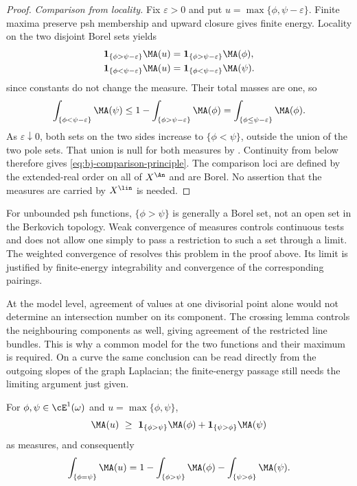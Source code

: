\begin{proof}
\emph{Comparison from locality.}
Fix $\varepsilon>0$ and put $u=\max\{\phi,\psi-\varepsilon\}$.
Finite maxima preserve psh membership and upward closure gives finite
energy. Locality on the two disjoint Borel sets yields
\[
 \begin{aligned}
 \mathbf1_{\{\phi>\psi-\varepsilon\}}\MA(u)
   &=\mathbf1_{\{\phi>\psi-\varepsilon\}}\MA(\phi),\\
 \mathbf1_{\{\phi<\psi-\varepsilon\}}\MA(u)
   &=\mathbf1_{\{\phi<\psi-\varepsilon\}}\MA(\psi).
 \end{aligned}
\]
since constants do not change the measure. Their total masses are one,
so
\[
 \int_{\{\phi<\psi-\varepsilon\}}\MA(\psi)
 \le 1-\int_{\{\phi>\psi-\varepsilon\}}\MA(\phi)
 =\int_{\{\phi\le\psi-\varepsilon\}}\MA(\phi).
\]
As $\varepsilon\downarrow0$, both sets on the two sides increase to
$\{\phi<\psi\}$, outside the union of the two pole sets. That union is
null for both measures by . Continuity from below
therefore gives \eqref{eq:bj-comparison-principle}.
The comparison loci are defined by the extended-real order on all of
$X^{\An}$ and are Borel. No assertion that the measures are carried by
$X^{\lin}$ is needed.
\end{proof}

\begin{remark}
\label{rem:ch46-locality-obstruction}
For unbounded psh functions, $\{\phi>\psi\}$ is generally a Borel set,
not an open set in the Berkovich topology. Weak convergence of measures
controls continuous tests and does not allow one simply to pass a
restriction to such a set through a limit. The weighted convergence of
\cite[Proposition~7.21(ii)]{BJ22} resolves this problem in the proof above.
Its limit is justified by finite-energy integrability and convergence of
the corresponding pairings.

At the model level, agreement of values at one divisorial point alone
would not determine an intersection number on its component. The
crossing lemma controls the neighbouring components as well, giving
agreement of the restricted line bundles. This is why a common model
for the two functions and their maximum is required. On a curve the
same conclusion can be read directly from the outgoing slopes of the
graph Laplacian; the finite-energy passage still needs the limiting
argument just given.
\end{remark}

\begin{corollary}
\label{cor:ch46-contact-mass}
For $\phi,\psi\in\cE^1(\omega)$ and $u=\max\{\phi,\psi\}$,
\[
 \MA(u)\ \ge\ \mathbf1_{\{\phi>\psi\}}\MA(\phi)
              +\mathbf1_{\{\psi>\phi\}}\MA(\psi)
\]
as measures, and consequently
\[
 \int_{\{\phi=\psi\}}\MA(u)
 =1-\int_{\{\phi>\psi\}}\MA(\phi)-\int_{\{\psi>\phi\}}\MA(\psi).
\]
\end{corollary}

